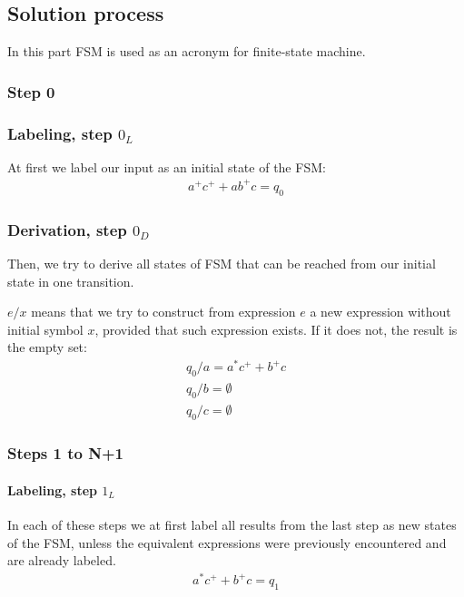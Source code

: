\documentclass{article}
\begin{document}
\subsection{Solution process}
\label{sec:solutionprocess}
In this part FSM is used as an acronym for finite-state machine.

\subsubsection{Step 0}
\label{sec:step0}

\subsubsection*{Labeling, step $0_L$}
At first we label our input as an initial state of the FSM:
\begin{gather*}
a^+c^+ + ab^+c = q_0
\end{gather*}

\subsubsection*{Derivation, step $0_D$}
Then, we try to derive all states of FSM that can be reached from our initial state in one
transition.

$e / x$ means that we try to construct from expression $e$ a new  expression without initial symbol
$x$, provided that such expression exists. If it does not, the result is the empty set:
\begin{gather*}
q_0 / a = a^*c^+ + b^+c \\
q_0 / b = \emptyset \\
q_0 / c = \emptyset
\end{gather*}

\subsubsection{Steps 1 to N+1}

\paragraph{Labeling, step $1_L$}
In each of these steps we at first label all results from the last step as new states of the FSM,
unless the equivalent expressions were previously encountered and are already labeled.
\begin{gather*}
a^*c^+ + b^+c = q_1
\end{gather*}
\end{document}
